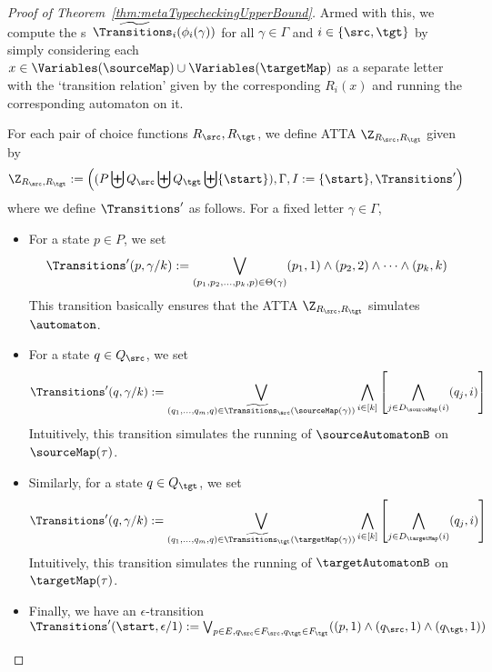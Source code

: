 \begin{proof}[Proof of Theorem~\ref{thm:metaTypecheckingUpperBound}]
  Armed with this, we compute the \extendedTransitionRelation s\ $\widetilde{\Transitions_i}(\phi_i(\gamma))$ for all $\gamma \in \Gamma$ and $i \in \{\src, \tgt\}$ by simply considering each $x \in \Variables(\sourceMap) \cup \Variables(\targetMap)$ as a separate letter with the `transition relation' given by the corresponding $R_i(x)$ and running the corresponding automaton on it.

  For each pair of choice functions $R_\src, R_\tgt$, we define ATTA $\Z_{R_\src, R_\tgt}$ given by
  \[ \Z_{R_\src, R_\tgt} := \left((P \biguplus Q_\src \biguplus Q_\tgt \biguplus \{\start\}), \Gamma, I := \{\start\}, \Transitions'\right) \]
  where we define $\Transitions'$ as follows. For a fixed letter $\gamma \in \Gamma$,
  \begin{itemize}
    \item For a state $p \in P$, we set
    \[ \Transitions'(p, \gamma/k) := \bigvee_{(p_1, p_2, \dots, p_k, p) \in \Theta(\gamma)}(p_1, 1) \land (p_2, 2) \land \dots \land (p_k, k) \]
    This transition basically ensures that the ATTA $\Z_{R_\src, R_\tgt}$ simulates $\automaton$.
    \item For a state $q \in Q_\src$, we set
    \[ \Transitions'(q, \gamma/k) := \bigvee_{(q_1, \dots, q_m, q) \in \widetilde{\Transitions_\src}(\sourceMap(\gamma))} \bigwedge_{i \in [k]} \left[\bigwedge_{j \in D_{\sourceMap}(i)}(q_j, i)\right] \]
    Intuitively, this transition simulates the running of $\sourceAutomatonB$ on $\sourceMap(\tau)$.
    \item Similarly, for a state $q \in Q_\tgt$, we set
    \[ \Transitions'(q, \gamma/k) := \bigvee_{(q_1, \dots, q_m, q) \in \widetilde{\Transitions_\tgt}(\targetMap(\gamma))} \bigwedge_{i \in [k]} \left[\bigwedge_{j \in D_{\targetMap}(i)}(q_j, i)\right] \]
    Intuitively, this transition simulates the running of $\targetAutomatonB$ on $\targetMap(\tau)$.
    \item Finally, we have an $\epsilon$-transition $\Transitions'(\start, \epsilon/1) := \bigvee_{p \in E, q_\src \in F_\src, q_\tgt \in F_\tgt}((p, 1) \land (q_\src, 1) \land (q_\tgt, 1))$
  \end{itemize}


\end{proof}
